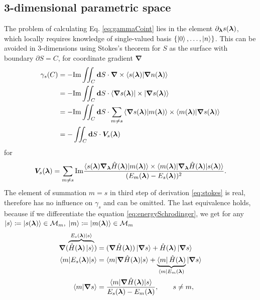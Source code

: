 \subsection{3-dimensional parametric space}
The problem of calculating Eq. \ref{eq:gammaCoint} lies in the element $\partial_{\bm\lambda} s({\bm\lambda})$, which locally requires knowledge of single-valued basis $\{\ket{0},\dots, \ket{n}\}$. This can be avoided in 3-dimensions using Stokes's theorem for $S$ as the surface with boundary $\partial S=C$, for coordinate gradient $\bm \nabla$
\begin{equation}
    \begin{split}
        \gamma_s(C) &= -\textrm{Im} \iint_C \bm{\mathrm{d}} S \cdot \bm \nabla \times \braket{s({\bm\lambda})|\bm \nabla n({\bm\lambda})}\\
         &= -\textrm{Im} \iint_C \bm{\mathrm{d}} S \cdot \braket{\bm \nabla s({\bm\lambda})|\times|\bm \nabla s({\bm\lambda})}\\
        &= -\textrm{Im} \iint_C \bm{\mathrm{d}} S \cdot \sum_{m\neq s} \braket{\bm \nabla s({\bm\lambda})|m({\bm\lambda})}\times \braket{m({\bm\lambda})|\bm \nabla s({\bm\lambda})}\\
        &= -\iint_C \bm{\mathrm{d}} S \cdot \bm V_s({\bm\lambda})
    \end{split}
    \label{eq:stokes}
\end{equation}
for 
\begin{equation}
    \bm V_s({\bm\lambda}) = \sum_{m\neq s} \textrm{Im} \frac{
            \braket{s({\bm\lambda})\bm \nabla_{\bm\lambda} \hat{H}({\bm\lambda}) |m({\bm\lambda})}\times \braket{m({\bm\lambda})|\bm \nabla_{\bm\lambda} \hat{H}({\bm\lambda})|s({\bm\lambda})}    
             }{
(E_m({\bm\lambda})-E_s({\bm\lambda}))^2
             }.
\end{equation}
The element of summation $m=s$ in third step of derivation \ref{eq:stokes} is real, therefore has no influence on $\gamma_s$ and can be omitted. The last equivalence holds, because if we differentiate the \Schrodinger equation \ref{eq:energySchrodinger}, we get for any $\ket{s}\coloneqq \ket{s({\bm\lambda})}\in \mathcal{M}_m,\;\ket{m}\coloneqq \ket{m({\bm\lambda})}\in \mathcal{M}_m$
\begin{equation}
    \begin{split}
        \bm \nabla (\overbrace{\hat{H}({\bm\lambda})\ket{s}}^{E_s({\bm\lambda})\ket{s}})&= (\bm\nabla \hat{H}({\bm\lambda}))\ket{\bm \nabla s} +\hat{H}({\bm\lambda}) \ket{\bm \nabla s}\\
        \braket{m|E_s({\bm\lambda})|s}&= \braket{m|\bm \nabla \hat{H}({\bm\lambda})| s}+ \underbrace{\bra{m} \hat{H}({\bm\lambda})}_{\bra{m} E_m({\bm\lambda})} |\bm\nabla s\rangle \\
        \braket{m|\bm \nabla s}&=
        \frac{\braket{m|\bm \nabla \hat{H}({\bm\lambda}) |s}}
        { E_s({\bm\lambda})-E_m({\bm\lambda})}, \qquad s\neq m,
    \end{split}
\end{equation}

